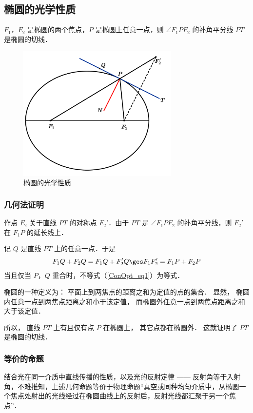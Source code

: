 \subsection{椭圆的光学性质}
$F_1$，$F_2$ 是椭圆的两个焦点，$ P $ 是椭圆上任意一点，则 $\angle F_1PF_2 $ 的补角平分线 $ PT $ 是椭圆的切线．
\begin{figure}[ht]
\centering
\includegraphics[width=8cm]{./figures/ConOpt3.pdf}
\caption{椭圆的光学性质} \label{ConOpt_fig3}
\end{figure}
\subsubsection{几何法证明}
作点 $F_2$ 关于直线 $PT$ 的对称点 $F_2'$．由于 $PT$ 是 $\angle F_1PF_2 $ 的补角平分线，则 $F_2'$ 在 $F_1P$ 的延长线上．

记 $Q$ 是直线 $PT$ 上的任意一点．于是
\begin{equation}\label{ConOpt_eq1}
F_1Q + F_2Q = F_1Q + F_2'Q \ges F_1F_2' = F_1P + F_2P
\end{equation}
当且仅当 $P$，$Q$ 重合时，不等式（\autoref{ConOpt_eq1}）为等式．

椭圆的一种定义为：
平面上到两焦点的距离之和为定值的点的集合． 显然， 椭圆内任意一点到两焦点距离之和小于该定值， 而椭圆外任意一点到两焦点距离之和大于该定值． 

所以， 直线 $PT$ 上有且仅有点 $P$ 在椭圆上， 其它点都在椭圆外． 这就证明了 $PT$ 是椭圆的切线．

\subsubsection{等价的命题}
结合光在同一介质中直线传播的性质，以及光的反射定律 —— 反射角等于入射角，不难推知，上述几何命题等价于物理命题“真空或同种均匀介质中，从椭圆一个焦点处射出的光线经过在椭圆曲线上的反射后，反射光线都汇聚于另一个焦点”．

